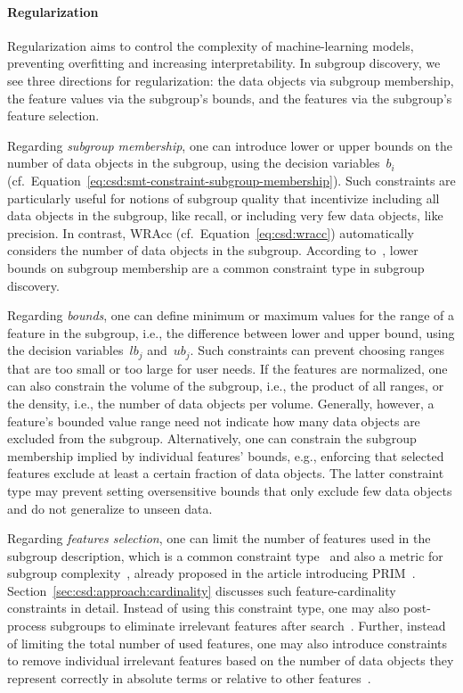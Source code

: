 \documentclass{article}
\theoremstyle{definition}
\begin{document}
\paragraph{Regularization}

Regularization aims to control the complexity of machine-learning models, preventing overfitting and increasing interpretability.
In subgroup discovery, we see three directions for regularization:
the data objects via subgroup membership, the feature values via the subgroup's bounds, and the features via the subgroup's feature selection.

Regarding \emph{subgroup membership}, one can introduce lower or upper bounds on the number of data objects in the subgroup, using the decision variables~$b_i$ (cf.~Equation~\ref{eq:csd:smt-constraint-subgroup-membership}).
Such constraints are particularly useful for notions of subgroup quality that incentivize including all data objects in the subgroup, like recall, or including very few data objects, like precision.
In contrast, WRAcc (cf.~Equation~\ref{eq:csd:wracc}) automatically considers the number of data objects in the subgroup.
According to~\cite{meeng2021real}, lower bounds on subgroup membership are a common constraint type in subgroup discovery.

Regarding \emph{bounds}, one can define minimum or maximum values for the range of a feature in the subgroup, i.e., the difference between lower and upper bound, using the decision variables~$\mathit{lb}_j$ and~$\mathit{ub}_j$.
Such constraints can prevent choosing ranges that are too small or too large for user needs.
If the features are normalized, one can also constrain the volume of the subgroup, i.e., the product of all ranges, or the density, i.e., the number of data objects per volume.
Generally, however, a feature's bounded value range need not indicate how many data objects are excluded from the subgroup.
Alternatively, one can constrain the subgroup membership implied by individual features' bounds, e.g., enforcing that selected features exclude at least a certain fraction of data objects.
The latter constraint type may prevent setting oversensitive bounds that only exclude few data objects and do not generalize to unseen data.

Regarding \emph{features selection}, one can limit the number of features used in the subgroup description, which is a common constraint type~\cite{meeng2021real} and also a metric for subgroup complexity~\cite{helal2016subgroup, herrera2011overview, ventura2018subgroup}, already proposed in the article introducing PRIM~\cite{friedman1999bump}.
Section~\ref{sec:csd:approach:cardinality} discusses such feature-cardinality constraints in detail.
Instead of using this constraint type, one may also post-process subgroups to eliminate irrelevant features after search~\cite{friedman1999bump}.
Further, instead of limiting the total number of used features, one may also introduce constraints to remove individual irrelevant features based on the number of data objects they represent correctly in absolute terms or relative to other features~\cite{lavrac2006relevancy}.
\end{document}
